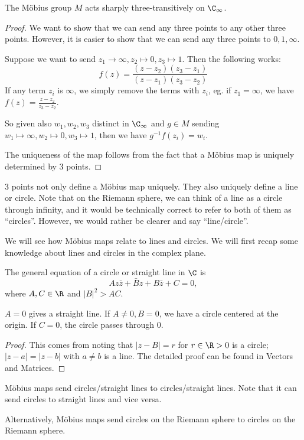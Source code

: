 \documentclass[a4paper]{article}
\begin{document}
\begin{prop}
  The M\"obius group $M$ acts sharply three-transitively on $\C_\infty$.
\end{prop}

\begin{proof}
  We want to show that we can send any three points to any other three points. However, it is easier to show that we can send any three points to $0, 1, \infty$.

  Suppose we want to send $z_1\to \infty, z_2\mapsto 0, z_3 \mapsto 1$. Then the following works:
  \[
    f(z) = \frac{(z - z_2)(z_3 - z_1)}{(z - z_1)(z_3 - z_2)}
  \]
  If any term $z_i$ is $\infty$, we simply remove the terms with $z_i$, eg. if $z_1 = \infty$, we have $f(z) = \frac{z - z_2}{z_3 - z_2}$.

  So given also $w_1, w_2, w_3$ distinct in $\C_\infty$ and $g\in M$ sending $w_1\mapsto \infty, w_2\mapsto 0, w_3\mapsto 1$, then we have $g^{-1}f(z_i) = w_i$.

  The uniqueness of the map follows from the fact that a M\"obius map is uniquely determined by 3 points.
\end{proof}

3 points not only define a M\"obius map uniquely. They also uniquely define a line or circle. Note that on the Riemann sphere, we can think of a line as a circle through infinity, and it would be technically correct to refer to both of them as ``circles''. However, we would rather be clearer and say ``line/circle''.

We will see how M\"obius maps relate to lines and circles. We will first recap some knowledge about lines and circles in the complex plane.

\begin{lemma}
  The general equation of a circle or straight line in $\C$ is
  \[
    Az\bar z + \bar Bz + B\bar z + C = 0,
  \]
  where $A, C\in \R$ and $|B|^2 > AC$.
\end{lemma}
$A = 0$ gives a straight line. If $A \not= 0, B = 0$, we have a circle centered at the origin. If $C = 0$, the circle passes through 0.

\begin{proof}
  This comes from noting that $|z - B| = r$ for $r \in \R> 0$ is a circle; $|z - a| = |z - b|$ with $a\not= b $ is a line. The detailed proof can be found in Vectors and Matrices.
\end{proof}

\begin{prop}
  M\"obius maps send circles/straight lines to circles/straight lines. Note that it can send circles to straight lines and vice versa.

  Alternatively, M\"obius maps send circles on the Riemann sphere to circles on the Riemann sphere.
\end{prop}
\end{document}
